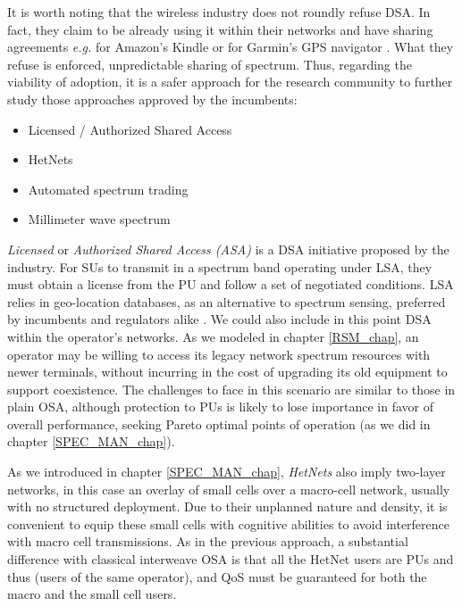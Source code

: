 It is worth noting that the wireless industry does not roundly refuse DSA. In fact, they claim to be already using it within their networks and have sharing agreements \textit{e.g.} for Amazon's Kindle or for Garmin's GPS navigator \cite{CTIA2011}. What they refuse is enforced, unpredictable sharing of spectrum. Thus, regarding the viability of adoption, it is a safer approach for the research community to further study those approaches approved by the incumbents:
\begin{itemize}
\item Licensed / Authorized Shared Access  
\item HetNets
\item Automated spectrum trading
\item Millimeter wave spectrum
\end{itemize}

\textit{Licensed} or \textit{Authorized Shared Access (ASA)} \cite{Matinmikko2013} is a DSA initiative proposed by the industry. For SUs to transmit in a spectrum band operating under LSA, they must obtain a license from the PU and follow a set of negotiated conditions. LSA relies in geo-location databases, as an alternative to spectrum sensing, preferred by incumbents and regulators alike \cite{Song2012}. %
We could also include in this point DSA within the operator's networks. As we modeled in chapter \ref{RSM_chap}, an operator may be willing to access its legacy network spectrum resources with newer terminals, without incurring in the cost of upgrading its old equipment to support coexistence. The challenges to face in this scenario are similar to those in plain OSA, although protection to PUs is likely to lose importance in favor of overall performance, seeking Pareto optimal points of operation (as we did in chapter \ref{SPEC_MAN_chap}). 

As we introduced in chapter \ref{SPEC_MAN_chap}, \textit{HetNets} also imply two-layer networks, in this case an overlay of small cells over a macro-cell network, usually with no structured deployment. Due to their unplanned nature and density, it is convenient to equip these small cells with cognitive abilities to avoid interference with macro cell transmissions. As in the previous approach, a substantial difference with classical interweave OSA is that all the HetNet users are PUs and thus (users of the same operator), and QoS must be guaranteed for both the macro and the small cell users. 

